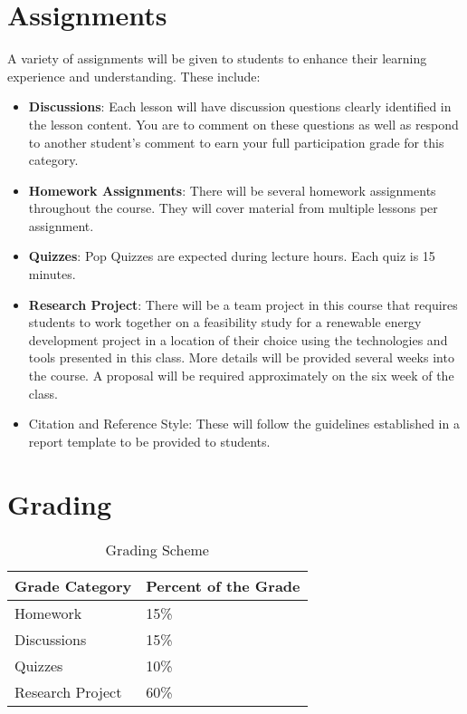\documentclass[11pt]{article}
\begin{document}
\section{Assignments}
A variety of assignments will be given to students to enhance their learning experience and understanding.  These include:
\begin{itemize}
\item \textbf{Discussions}: Each lesson will have discussion questions clearly identified in the lesson content. 
You are to comment on these questions as well as respond to another 
student's comment to earn your full participation grade for this category.
\item \textbf{Homework Assignments}: There will be several homework assignments throughout the course. They 
will cover material from multiple lessons per assignment.
\item \textbf{Quizzes}: Pop Quizzes are expected during lecture hours.  Each quiz is 15 minutes.
\item \textbf{Research Project}: There will be a team project in this course that requires students to work together  on a feasibility study for a renewable energy development project in a location of their choice 
using the technologies and tools presented in this class. More details will be provided several 
weeks into the course. A proposal will be required approximately on the six week of the class.
\item Citation and Reference Style: These will follow the guidelines established in a report template to be provided to students.
\end{itemize}
\newpage

\section{Grading}
	
	\begin{table}[h!]
	    \centering
	    \begin{tabular}{|l|l|}
	         	\hline\hline
	Grade Category	& Percent of the Grade		\\
		\hline\hline  
		Homework	& 15\%	\\
		Discussions	& 15\%	\\
		Quizzes & 10\%\\
		Research Project	& 60\%	\\
		\hline\hline
	    \end{tabular}
	    \caption{Grading Scheme}
	    \label{tab:grades1}
	\end{table}
	
\end{document}
